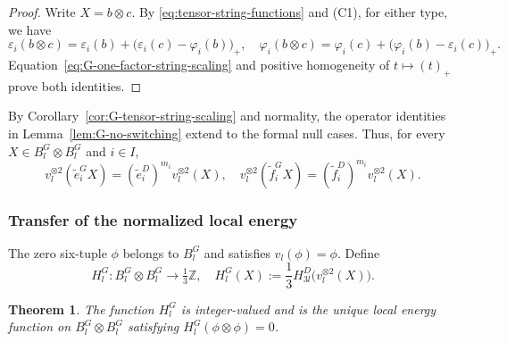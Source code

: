 \documentclass[11pt,reqno]{amsart}
\numberwithin{table}{section}
\numberwithin{equation}{section}
\theoremstyle{plain}
\newtheorem{theorem}{Theorem}[section]
\theoremstyle{definition}
\begin{document}
\begin{proof}
	Write \(X=b\otimes c\).
	By \eqref{eq:tensor-string-functions} and \textup{(C1)},
	for either type, we have
	\[
		\varepsilon_i(b\otimes c)
		=
		\varepsilon_i(b)
		+
		\bigl(\varepsilon_i(c)-\varphi_i(b)\bigr)_+,\quad
		\varphi_i(b\otimes c)
		=
		\varphi_i(c)
		+
		\bigl(\varphi_i(b)-\varepsilon_i(c)\bigr)_+.
	\]
	Equation~\eqref{eq:G-one-factor-string-scaling} and
	positive homogeneity of \(t\mapsto(t)_+\) prove both identities.
\end{proof}

By Corollary~\ref{cor:G-tensor-string-scaling} and normality,
the operator identities in Lemma~\ref{lem:G-no-switching}
extend to the formal null cases.
Thus, for every \(X\in B_l^G\otimes B_l^G\) and \(i\in I\),
\[
v_l^{\otimes2}(\widetilde e_i^G X)
=
(\widetilde e_i^D)^{m_i}v_l^{\otimes2}(X),
\quad
v_l^{\otimes2}(\widetilde f_i^G X)
=
(\widetilde f_i^D)^{m_i}v_l^{\otimes2}(X).
\]

\subsubsection{Transfer of the normalized local energy}

The zero six-tuple \(\phi\) belongs to \(B_l^G\) and satisfies
\(v_l(\phi)=\phi\).
Define
\begin{equation}\label{eq:G-energy-transfer}
	H_l^G:
	B_l^G\otimes B_l^G
	\longrightarrow
	\tfrac13\mathbb Z,
	\quad
	H_l^G(X)
	:=
	\frac13
	H_{3l}^D\bigl(v_l^{\otimes2}(X)\bigr).
\end{equation}

\begin{theorem}
	\label{thm:G-energy-transfer}
	The function \(H_l^G\) is integer-valued and is the unique
	local energy function on \(B_l^G\otimes B_l^G\) satisfying
	\(H_l^G(\phi\otimes\phi)=0\).
\end{theorem}
\end{document}
